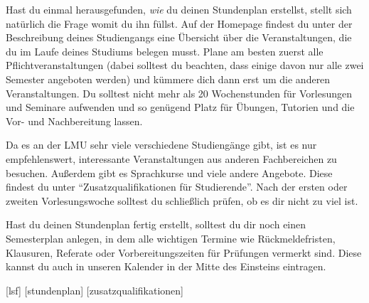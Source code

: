 Hast du einmal herausgefunden, \textit{wie} du deinen Stundenplan erstellst, stellt sich natürlich die Frage womit du ihn füllst. Auf der Homepage findest du unter der Beschreibung deines Studiengangs eine Übersicht über die Veranstaltungen, die du im Laufe deines Studiums belegen musst. Plane am besten zuerst alle Pflichtveranstaltungen (dabei solltest du beachten, dass einige davon nur alle zwei Semester angeboten werden) und kümmere dich dann erst um die anderen Veranstaltungen. Du solltest nicht mehr als 20 Wochenstunden für Vorlesungen und Seminare aufwenden und so genügend Platz für Übungen, Tutorien und die Vor- und Nachbereitung lassen.

Da es an der LMU sehr viele verschiedene Studiengänge gibt, ist es nur empfehlenswert, interessante Veranstaltungen aus anderen Fachbereichen zu besuchen. Außerdem gibt es Sprachkurse und viele andere Angebote. Diese findest du unter \enquote{Zusatzqualifikationen für Studierende}. Nach der ersten oder zweiten Vorlesungswoche solltest du schließlich prüfen, ob es dir nicht zu viel ist.

Hast du deinen Stundenplan fertig erstellt, solltest du dir noch einen Semesterplan anlegen, in dem alle wichtigen Termine wie Rückmeldefristen, Klausuren, Referate oder Vorbereitungszeiten für Prüfungen vermerkt sind. Diese kannst du auch in unseren Kalender in der Mitte des Einsteins eintragen.

\begin{urlList}
	[lsf]
	[stundenplan]
	[zusatzqualifikationen]
\end{urlList}

	


